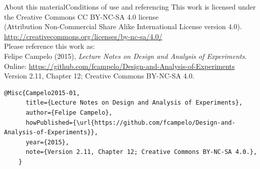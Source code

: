 \documentclass[t]{beamer}
\begin{document}
\begin{ftstf}{About this material}{Conditions of use and referencing}
\centering\footnotesize This work is licensed under the Creative Commons CC BY-NC-SA 4.0 license\\(Attribution Non-Commercial Share Alike International License version 4.0).\\
\vhalf
\url{http://creativecommons.org/licenses/by-nc-sa/4.0/}\\
\vone
\footnotesize Please reference this work as:\\
\footnotesize \flushleft Felipe Campelo (2015), \textit{Lecture Notes on Design and Analysis of Experiments}.\\Online: {\scriptsize\url{https://github.com/fcampelo/Design-and-Analysis-of-Experiments}}\\
Version 2.11, Chapter 12; Creative Commons BY-NC-SA 4.0.\\

\begin{Verbatim}[fontsize=\tiny]
    @Misc{Campelo2015-01,
      title={Lecture Notes on Design and Analysis of Experiments},
      author={Felipe Campelo},
      howPublished={\url{https://github.com/fcampelo/Design-and-Analysis-of-Experiments}},
      year={2015},
      note={Version 2.11, Chapter 12; Creative Commons BY-NC-SA 4.0.},
    }
\end{Verbatim}

\end{ftstf}
\end{document}
